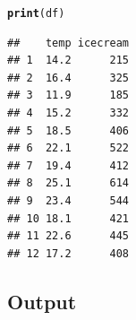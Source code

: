 \documentclass[slidestop,compress,14pt,xcolor=dvipsnames]{beamer}\usepackage[]{graphicx}\usepackage[]{color}
\makeatletter
\newcommand{\hlstd}[1]{\textcolor[rgb]{0.345,0.345,0.345}{#1}}%
\newcommand{\hlkwd}[1]{\textcolor[rgb]{0.737,0.353,0.396}{\textbf{#1}}}%
\newenvironment{kframe}{%
 \def\at@end@of@kframe{}%
 \ifinner\ifhmode%
  \def\at@end@of@kframe{\end{minipage}}%
  \begin{minipage}{\columnwidth}%
 \fi\fi%
 \def\FrameCommand##1{\hskip\@totalleftmargin \hskip-\fboxsep
 \colorbox{shadecolor}{##1}\hskip-\fboxsep
     \hskip-\linewidth \hskip-\@totalleftmargin \hskip\columnwidth}%
 \MakeFramed {\advance\hsize-\width
   \@totalleftmargin\z@ \linewidth\hsize
   \@setminipage}}%
 {\par\unskip\endMakeFramed%
 \at@end@of@kframe}
\newenvironment{knitrout}{}{} %
\makeatother
\begin{document}
\begin{knitrout}
\color{fgcolor}\begin{kframe}
\begin{alltt}
\hlkwd{print}\hlstd{(df)}
\end{alltt}
\begin{verbatim}
##    temp icecream
## 1  14.2      215
## 2  16.4      325
## 3  11.9      185
## 4  15.2      332
## 5  18.5      406
## 6  22.1      522
## 7  19.4      412
## 8  25.1      614
## 9  23.4      544
## 10 18.1      421
## 11 22.6      445
## 12 17.2      408
\end{verbatim}
\end{kframe}
\end{knitrout}







\subsection{Output}

\clearpage 
\end{document}
